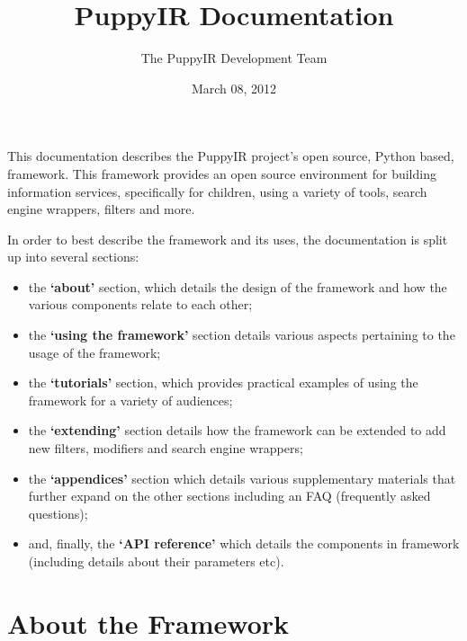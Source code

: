\documentclass[letterpaper,10pt,english]{sphinxmanual}
\title{PuppyIR Documentation}
\date{March 08, 2012}
\author{The PuppyIR Development Team}
\begin{document}
\maketitle
\tableofcontents
{}\label{index::doc}


This documentation describes the PuppyIR project's open source, Python based, framework. This framework provides an open source environment for building information services, specifically for children, using a variety of tools, search engine wrappers, filters and more.

In order to best describe the framework and its uses, the documentation is split up into several sections:
\begin{itemize}
\item {} 
the \textbf{`about'} section, which details the design of the framework and how the various components relate to each other;

\item {} 
the \textbf{`using the framework'} section details various aspects pertaining to the usage of the framework;

\item {} 
the \textbf{`tutorials'} section, which provides practical examples of using the framework for a variety of audiences;

\item {} 
the \textbf{`extending'} section details how the framework can be extended to add new filters, modifiers and search engine wrappers;

\item {} 
the \textbf{`appendices'} section which details various supplementary materials that further expand on the other sections including an FAQ (frequently asked questions);

\item {} 
and, finally, the  \textbf{`API reference'} which details the components in framework (including details about their parameters etc).

\end{itemize}


\chapter{About the Framework}
\label{index:welcome-to-the-puppyir-framework-documentation}\label{index:about-the-framework}
\end{document}
